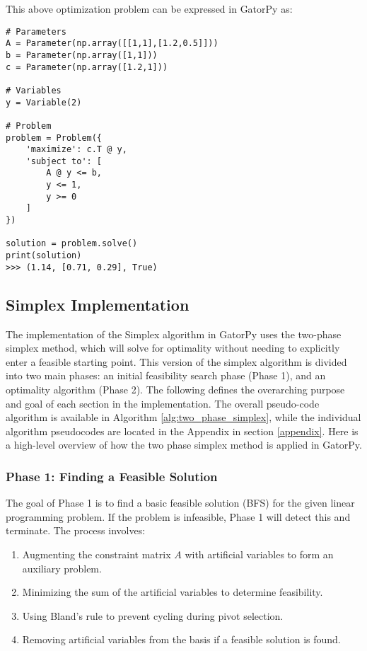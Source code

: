 \documentclass[conference]{IEEEtran}
\begin{document}
This above optimization problem can be expressed in GatorPy as:
\begin{lstlisting}[style=mypython, caption={Solving a Linear Program Symbolically}]
# Parameters
A = Parameter(np.array([[1,1],[1.2,0.5]]))
b = Parameter(np.array([1,1]))
c = Parameter(np.array([1.2,1]))

# Variables
y = Variable(2)

# Problem
problem = Problem({
    'maximize': c.T @ y,
    'subject to': [
        A @ y <= b,
        y <= 1,
        y >= 0
    ]
})

solution = problem.solve()
print(solution)
>>> (1.14, [0.71, 0.29], True)
\end{lstlisting}

\subsection{Simplex Implementation}
\label{Simplex}
The implementation of the Simplex algorithm in GatorPy uses  the two-phase simplex method, which will solve for optimality without needing to explicitly enter a feasible starting point.
This version of the simplex algorithm is divided into two main phases: an initial feasibility search phase (Phase 1), and an optimality algorithm (Phase 2). 
The following defines the overarching purpose and goal of each section in the implementation.
The overall pseudo-code algorithm is available in Algorithm \ref{alg:two_phase_simplex}, while the individual algorithm pseudocodes are located in the Appendix in section \ref{appendix}.
Here is a high-level overview of how the two phase simplex method is applied in GatorPy.

\subsubsection{Phase 1: Finding a Feasible Solution}
The goal of Phase 1 is to find a basic feasible solution (BFS) for the given linear programming problem. If the problem is infeasible, Phase 1 will detect this and terminate. The process involves:
\begin{enumerate}
    \item Augmenting the constraint matrix \( A \) with artificial variables to form an auxiliary problem.
    \item Minimizing the sum of the artificial variables to determine feasibility.
    \item Using Bland's rule to prevent cycling during pivot selection.
    \item Removing artificial variables from the basis if a feasible solution is found.
\end{enumerate}
\end{document}
